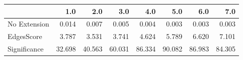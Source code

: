 \begin{tabular}{lrrrrrrr}
\toprule
{} &    1.0 &    2.0 &    3.0 &    4.0 &    5.0 &    6.0 &    7.0 \\
\midrule
No Extension &  0.014 &  0.007 &  0.005 &  0.004 &  0.003 &  0.003 &  0.003 \\
EdgesScore   &  3.787 &  3.531 &  3.741 &  4.624 &  5.789 &  6.620 &  7.101 \\
Significance & 32.698 & 40.563 & 60.031 & 86.334 & 90.082 & 86.983 & 84.305 \\
\bottomrule
\end{tabular}
